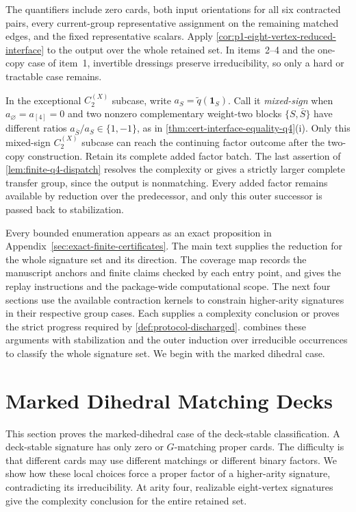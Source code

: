 \documentclass[11pt,letterpaper,onecolumn]{article}
\theoremstyle{plain}
\theoremstyle{definition}
\theoremstyle{remark}
\newcommand{\CycX}[1]{{C_{#1}^{(X)}}}
\newcommand{\one}{\mathbf 1}
\begin{document}
The quantifiers include zero cards, both input orientations for all six
contracted pairs, every current-group representative assignment on the
remaining matched edges, and the fixed representative scalars. Apply
\cref{cor:p1-eight-vertex-reduced-interface} to the output over the whole
retained set. In items~2--4 and the one-copy case of item~1, invertible
dressings preserve irreducibility, so only a hard or tractable case remains.

In the exceptional \(\CycX{2}\) subcase, write
\(a_S=\widetilde q(\one_S)\).  Call it \emph{mixed-sign} when
\(a_\varnothing=a_{[4]}=0\) and two nonzero complementary weight-two
blocks \(\{S,\bar S\}\) have different ratios
\(a_{\bar S}/a_S\in\{1,-1\}\), as in
\cref{thm:cert-interface-equality-q4}\textnormal{(i)}. Only this mixed-sign
\(\CycX{2}\) subcase can reach the continuing factor outcome after the two-copy
construction. Retain its complete added factor batch. The last assertion of
\cref{lem:finite-q4-dispatch} resolves the complexity or gives a strictly
larger complete transfer group, since the output is nonmatching. Every added
factor remains available by reduction over the predecessor, and only this
outer successor is passed back to stabilization.


Every bounded enumeration appears as an exact proposition in
Appendix~\ref{sec:exact-finite-certificates}. The main text supplies the reduction for the whole signature set and its direction.  The coverage map
 records the manuscript anchors
and finite claims checked by each entry point, and
 gives the replay instructions and the
package-wide computational scope.  The next four sections use the available contraction kernels to constrain
higher-arity signatures in their respective group cases. Each supplies
a complexity conclusion or proves the strict progress required by
\cref{def:protocol-discharged}.  combines these
arguments with stabilization and the outer induction over irreducible
occurrences to classify the whole signature set. We begin with the
marked dihedral case.
\section{Marked Dihedral Matching Decks}
\label{sec:normalized-dihedral}

This section proves the marked-dihedral case of the deck-stable
classification. A deck-stable signature has only zero or \(G\)-matching
proper cards. The difficulty is that different cards may use different
matchings or different binary factors. We show how these local choices
force a proper factor of a higher-arity signature, contradicting its
irreducibility. At arity four, realizable eight-vertex signatures give
the complexity conclusion for the entire retained set.
\end{document}
